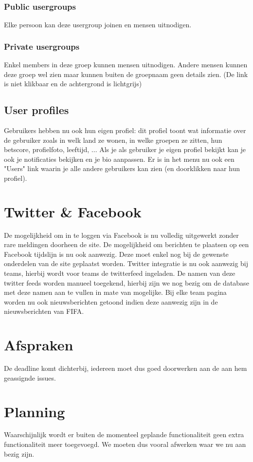 \documentclass[11pt, a4paper]{article}
\begin{document}
\subsubsection{Public usergroups}
Elke persoon kan deze usergroup joinen en mensen uitnodigen.
\subsubsection{Private usergroups}
Enkel members in deze groep kunnen mensen uitnodigen. Andere mensen kunnen deze groep wel zien maar kunnen buiten de groepnaam geen details zien. (De link is niet klikbaar en de achtergrond is lichtgrijs)

\subsection{User profiles}
Gebruikers hebben nu ook hun eigen profiel: dit profiel toont wat informatie over de gebruiker zoals in welk land ze wonen, in welke groepen ze zitten, hun betscore, profielfoto, leeftijd, ...
Als je als gebruiker je eigen profiel bekijkt kan je ook je notificaties bekijken en je bio aanpassen.
Er is in het menu nu ook een "Users" link waarin je alle andere gebruikers kan zien (en doorklikken naar hun profiel).

\section{Twitter & Facebook}
De mogelijkheid om in te loggen via Facebook is nu volledig uitgewerkt zonder rare meldingen doorheen de site. De mogelijkheid om berichten te plaatsen op een Facebook tijdslijn is nu ook aanwezig. Deze moet enkel nog bij de gewenste onderdelen van de site geplaatst worden. Twitter integratie is nu ook aanwezig bij teams, hierbij wordt voor teams de twitterfeed ingeladen. De namen van deze twitter feeds worden manueel toegekend, hierbij zijn we nog bezig om de database met deze namen aan te vullen in mate van mogelijke. Bij elke team pagina worden nu ook nieuwsberichten getoond indien deze aanwezig zijn in de nieuwsberichten van FIFA.

\section{Afspraken}
De deadline komt dichterbij, iedereen moet dus goed doorwerken aan de aan hem geassignde issues.


\section{Planning}
Waarschijnlijk wordt er buiten de momenteel geplande functionaliteit geen extra functionaliteit meer toegevoegd. We moeten dus vooral afwerken waar we nu aan bezig zijn.
\end{document}
